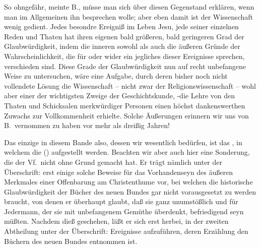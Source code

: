 So ohngefähr, meinte B., müsse man sich über diesen Gegenstand erklären, wenn man im Allgemeinen ihn besprechen wolle; aber eben damit ist der Wissenschaft wenig gedient. Jedes besondre Ereigniß im Leben Jesu, jede seiner einzelnen Reden und Thaten hat ihren eigenen bald größeren, bald geringeren Grad der Glaubwürdigkeit, indem die inneren sowohl als auch die äußeren Gründe der Wahrscheinlichkeit, die für oder wider ein jegliches dieser Ereignisse sprechen, verschieden sind. Diese Grade der Glaubwürdigkeit nun auf recht unbefangene Weise zu untersuchen, wäre eine Aufgabe, durch deren bisher noch nicht vollendete Lösung die Wissenschaft -- nicht zwar der Religionswissenschaft -- wohl aber einer der wichtigsten Zweige der Geschichtskunde, -die Lehre von den Thaten und Schicksalen merkwürdiger Personen einen höchst dankenswerthen Zuwachs zur Vollkommenheit erhielte. Solche Äußerungen erinnern wir uns von B.\ vernommen zu haben vor mehr als dreißig Jahren! \par
\gliederungslinie {}\par
Das einzige  in diesem Bande also, dessen wir wesentlich bedürfen, ist das , in welchem die  () aufgestellt werden. Beachten wir aber auch hier eine Sonderung, die der Vf.\ nicht ohne Grund gemacht hat. Er trägt nämlich unter der Überschrift:  erst einige solche Beweise für das Vorhandenseyn des äußeren Merkmales einer Offenbarung am Christenthume vor, bei welchen die historische Glaubwürdigkeit der Bücher des neuen Bundes gar nicht vorausgesetzt zu werden braucht, von denen er überhaupt glaubt, daß sie ganz unumstößlich und für Jedermann, der sie mit unbefangenem Gemüthe überdenkt, befriedigend seyn müßten. Nachdem dieß geschehen, läßt er sich erst herbei, in der zweiten Abtheilung unter der Überschrift:  Ereignisse aufzuführen, deren Erzählung den Büchern des neuen Bundes entnommen ist. \par
